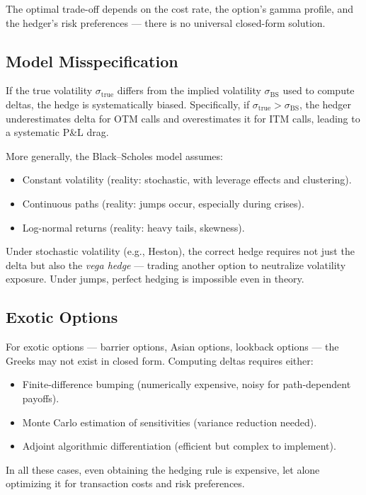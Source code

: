 \documentclass[11pt, a4paper]{article}
\theoremstyle{definition}
\theoremstyle{plain}
\theoremstyle{remark}
\begin{document}
The optimal trade-off depends on the cost rate, the option's gamma profile, and
the hedger's risk preferences --- there is no universal closed-form solution.

\subsection{Model Misspecification}

If the true volatility $\sigma_{\text{true}}$ differs from the implied volatility
$\sigma_{\text{BS}}$ used to compute deltas, the hedge is systematically biased.
Specifically, if $\sigma_{\text{true}} > \sigma_{\text{BS}}$, the hedger underestimates delta
for OTM calls and overestimates it for ITM calls, leading to a systematic P\&L drag.

More generally, the Black--Scholes model assumes:
\begin{itemize}
    \item Constant volatility (reality: stochastic, with leverage effects and clustering).
    \item Continuous paths (reality: jumps occur, especially during crises).
    \item Log-normal returns (reality: heavy tails, skewness).
\end{itemize}

Under stochastic volatility (e.g., Heston), the correct hedge requires not just
the delta but also the \emph{vega hedge} --- trading another option to neutralize
volatility exposure.
Under jumps, perfect hedging is impossible even in theory.

\subsection{Exotic Options}

For exotic options --- barrier options, Asian options, lookback options --- the Greeks
may not exist in closed form.
Computing deltas requires either:
\begin{itemize}
    \item Finite-difference bumping (numerically expensive, noisy for path-dependent payoffs).
    \item Monte Carlo estimation of sensitivities (variance reduction needed).
    \item Adjoint algorithmic differentiation (efficient but complex to implement).
\end{itemize}

In all these cases, even obtaining the hedging rule is expensive,
let alone optimizing it for transaction costs and risk preferences.
\end{document}
